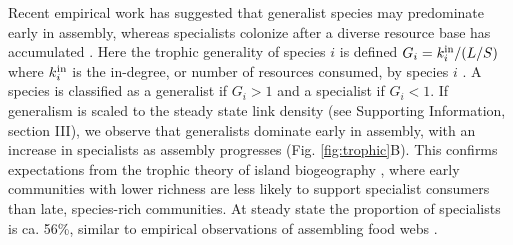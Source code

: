 \documentclass[9pt,twocolumn,twoside]{pnas-new}
\newcommand{\rr}[1]{{\rm #1}}
\begin{document}
% 




Recent empirical work has suggested that generalist species may predominate early in assembly, whereas specialists colonize after a diverse resource base has accumulated \cite{Piechnik2008,Gravel2011}.
Here the trophic generality of species $i$ is defined $G_i = k^{\rm in}_i/(L/S)$ where $k^{\rm in}_i$ is the in-degree, or number of resources consumed, by species $i$ \cite{Williams2000}.
A species is classified as a generalist if $G_i > 1$ and a specialist if $G_i < 1$.
If generalism is scaled to the steady state link density (see Supporting Information, section III), we observe that generalists dominate early in assembly, with an increase in specialists as assembly progresses (Fig. \ref{fig:trophic}B).
This confirms expectations from the trophic theory of island biogeography \cite{Gravel2011}, where early communities with lower richness are less likely to support specialist consumers than late, species-rich communities.
At steady state the proportion of specialists is ca. 56\%, similar to empirical observations of assembling food webs \cite{Piechnik2008}.
\end{document}
